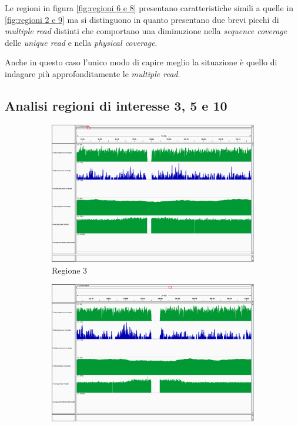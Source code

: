 Le regioni in figura \ref{fig:regioni 6 e 8} presentano caratteristiche simili a quelle in \ref{fig:regioni 2 e 9} ma si distinguono in quanto presentano due brevi picchi di \emph{multiple read} distinti che comportano una diminuzione nella \emph{sequence coverage} delle \emph{unique read} e nella \emph{physical coverage}.

Anche in questo caso l'unico modo di capire meglio la situazione è quello di indagare più approfonditamente le \emph{multiple read}.

\subsection{Analisi regioni di interesse 3, 5 e 10}
\begin{figure}[htbp]
	\centering
	\begin{subfigure}[b]{.45\textwidth}
		\includegraphics[width=\textwidth]{immagini/igv_regione3.png}
		\caption{Regione 3}
	\end{subfigure}
	\quad
	\begin{subfigure}[b]{.45\textwidth}
		\includegraphics[width=\textwidth]{immagini/igv_regione5.png}

\end{subfigure}
\end{figure}
